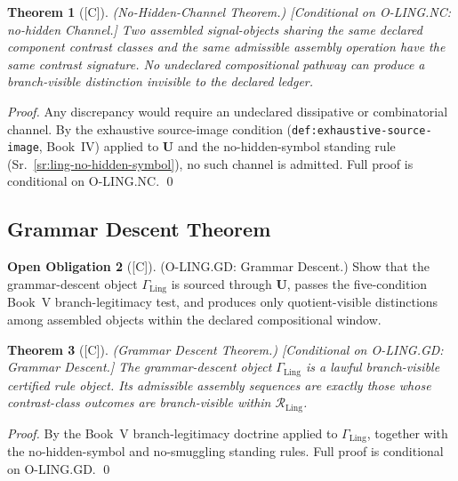 \documentclass[12pt,oneside]{amsbook}
\theoremstyle{plain}
\newtheorem{theorem}{Theorem}[section]
\theoremstyle{definition}
\newtheorem{obligation}[theorem]{Open Obligation}
\theoremstyle{remark}
\newcommand{\status}[1]{\textup{[#1]}}
\begin{document}
\begin{theorem}[\status{C}]\label{thm:ling-no-hidden-channel}
\textup{(No-Hidden-Channel Theorem.)}
\textup{[Conditional on O-LING.NC: no-hidden Channel.]}
Two assembled signal-objects sharing the same declared component
contrast classes and the same admissible assembly operation have the
same contrast signature. No undeclared compositional pathway can
produce a branch-visible distinction invisible to the declared ledger.
\end{theorem}

\begin{proof}
Any discrepancy would require an undeclared dissipative or
combinatorial channel. By the exhaustive source-image condition
(\texttt{def:exhaustive-source-image}, Book~IV) applied to
$\mathbf{U}$ and the no-hidden-symbol standing rule
(Sr.~\ref{sr:ling-no-hidden-symbol}), no such channel is admitted.
Full proof is conditional on O-LING.NC.
\qed
\end{proof}

\subsection{Grammar Descent Theorem}\label{sec:ling-GD}

\begin{obligation}[\status{C}]\label{ob:ling-GD}
\textup{(O-LING.GD: Grammar Descent.)}
Show that the grammar-descent object $\Gamma_{\mathrm{Ling}}$ is
sourced through $\mathbf{U}$, passes the five-condition Book~V
branch-legitimacy test, and produces only quotient-visible distinctions
among assembled objects within the declared compositional window.
\end{obligation}

\begin{theorem}[\status{C}]\label{thm:ling-grammar-descent}
\textup{(Grammar Descent Theorem.)}
\textup{[Conditional on O-LING.GD: Grammar Descent.]}
The grammar-descent object $\Gamma_{\mathrm{Ling}}$ is a lawful
branch-visible certified rule object. Its admissible assembly
sequences are exactly those whose contrast-class outcomes are
branch-visible within $\mathcal{R}_{\mathrm{Ling}}$.
\end{theorem}

\begin{proof}
By the Book~V branch-legitimacy doctrine applied to
$\Gamma_{\mathrm{Ling}}$, together with the no-hidden-symbol and
no-smuggling standing rules. Full proof is conditional on O-LING.GD.
\qed
\end{proof}
\end{document}
